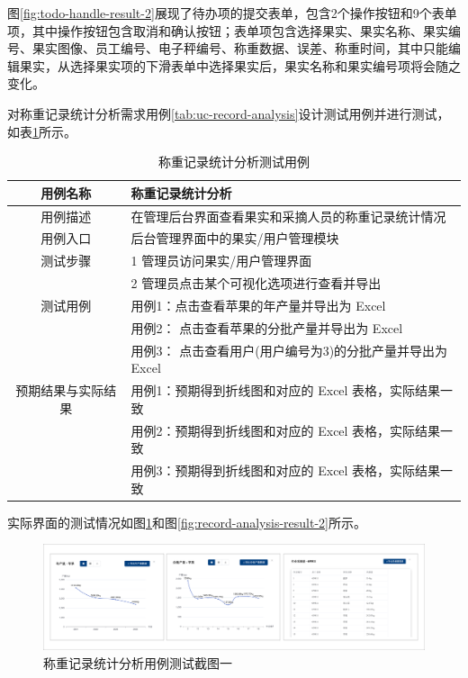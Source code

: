 图\ref{fig:todo-handle-result-2}展现了待办项的提交表单，包含2个操作按钮和9个表单项，其中操作按钮包含取消和确认按钮；表单项包含选择果实、果实名称、果实编号、果实图像、员工编号、电子秤编号、称重数据、误差、称重时间，其中只能编辑果实，从选择果实项的下滑表单中选择果实后，果实名称和果实编号项将会随之变化。

对称重记录统计分析需求用例\ref{tab:uc-record-analysis}设计测试用例并进行测试，如表\ref{tab:uc-record-analysis-test}所示。

\begin{longtable}[ht]{|c|p{8cm}|}
\caption{称重记录统计分析测试用例}
\label{tab:uc-record-analysis-test}
\\
\hline
用例名称 & 称重记录统计分析 \\
\hline
用例描述 & 在管理后台界面查看果实和采摘人员的称重记录统计情况 \\
\hline
用例入口 & 后台管理界面中的果实/用户管理模块 \\
\hline
测试步骤 & 1 管理员访问果实/用户管理界面 \\
& 2 管理员点击某个可视化选项进行查看并导出 \\
\hline
测试用例 & 用例1：点击查看苹果的年产量并导出为 Excel \\
& 用例2： 点击查看苹果的分批产量并导出为 Excel \\
& 用例3： 点击查看用户(用户编号为3)的分批产量并导出为 Excel  \\
\hline
预期结果与实际结果 & 用例1：预期得到折线图和对应的 Excel 表格，实际结果一致 \\
& 用例2：预期得到折线图和对应的 Excel 表格，实际结果一致 \\
& 用例3：预期得到折线图和对应的 Excel 表格，实际结果一致 \\
\hline
\end{longtable}

实际界面的测试情况如图\ref{fig:record-analysis-result-1}和图\ref{fig:record-analysis-result-2}所示。

\begin{figure}[H]
    \centering
    \includegraphics[width=0.8\linewidth]{../result/record-analysis-result-1.png}
    \caption{称重记录统计分析用例测试截图一}
    \label{fig:record-analysis-result-1}
\end{figure}

